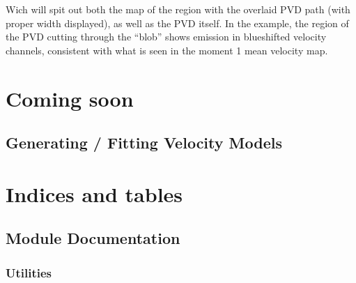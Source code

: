 \documentclass[letterpaper,10pt,english]{sphinxmanual}
\let\sphinxpxdimen\pdfpxdimen\else\newdimen\sphinxpxdimen
\begin{document}
\begin{sphinxVerbatim}[commandchars=\\\{\}]
       
  
\end{sphinxVerbatim}

\sphinxAtStartPar
Wich will spit out both the map of the region with the overlaid PVD path (with proper width displayed), as
well as the PVD itself. In the example, the region of the PVD cutting through the “blob” shows emission in
blue\sphinxhyphen{}shifted velocity channels, consistent with what is seen in the moment 1 mean velocity map.

\noindent\sphinxincludegraphics[width=600\sphinxpxdimen]{{example_pvd}.png}


\chapter{Coming soon}
\label{\detokenize{index:coming-soon}}
\sphinxstepscope


\section{Generating / Fitting Velocity Models}
\label{\detokenize{modeling:generating-fitting-velocity-models}}\label{\detokenize{modeling::doc}}

\chapter{Indices and tables}
\label{\detokenize{index:indices-and-tables}}
\sphinxstepscope


\section{Module Documentation}
\label{\detokenize{modules:module-documentation}}\label{\detokenize{modules::doc}}

\subsection{Utilities}
\label{\detokenize{modules:module-cubespa.channel_maps}}\label{\detokenize{modules:utilities}}\label{\detokenize{modules:module-cubespa.cubespa}}
\end{document}
